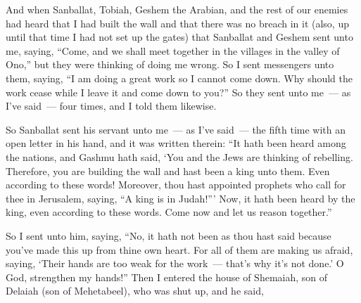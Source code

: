 
\begin{inparaenum}
     And when Sanballat, Tobiah, Geshem the Arabian, and the rest of our enemies had heard that I had built the wall and that there was no breach in it (also, up until that time I had not set up the gates)%
     that Sanballat and Geshem sent unto me, saying, ``Come, and we shall meet together in the villages in the valley of Ono,'' but they were thinking of doing me wrong.%
     So I sent messengers unto them, saying, ``I am doing a great work so I cannot come down. Why should the work cease while I leave it and come down to you?''%
     So they sent unto me~--- as I've said~--- four times, and I told them likewise.%
    
     So Sanballat sent his servant unto me~--- as I've said~--- the fifth time with an open letter in his hand,%
     and it was written therein: ``It hath been heard among the nations, and Gashmu hath said, `You and the Jews are thinking of rebelling. Therefore, you are building the wall and hast been a king unto them. Even according to these words!%
     Moreover, thou hast appointed prophets who call for thee in Jerusalem, saying, ``A king is in Judah!''' Now, it hath been heard by the king, even according to these words. Come now and let us reason together.''%
    
     So I sent unto him, saying, ``No, it hath not been as thou hast said because you've made this up from thine own heart.%
     For all of them are making us afraid, saying, `Their hands are too weak for the work~--- that's why it's not done.' O God, strengthen my hands!''%
     Then I entered the house of Shemaiah, son of Delaiah (son of Mehetabeel), who was shut up, and he said,%




\end{inparaenum}
